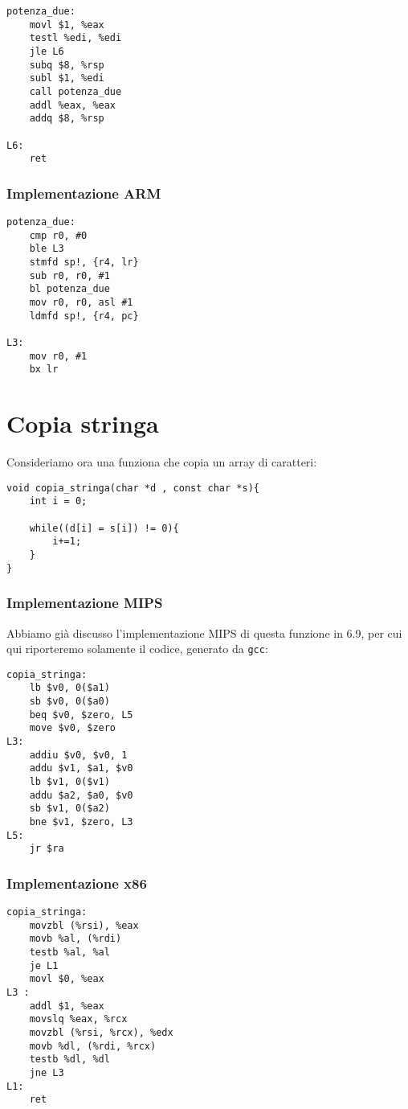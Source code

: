 \documentclass[class=book, crop=false, oneside]{standalone}
\begin{document}
\begin{verbatim}
potenza_due:
	movl $1, %eax
	testl %edi, %edi
	jle L6
	subq $8, %rsp
	subl $1, %edi
	call potenza_due
	addl %eax, %eax
	addq $8, %rsp

L6:
	ret
\end{verbatim}

\subsubsection{Implementazione ARM}

\begin{verbatim}
potenza_due:
	cmp r0, #0
	ble L3
	stmfd sp!, {r4, lr}
	sub r0, r0, #1
	bl potenza_due
	mov r0, r0, asl #1
	ldmfd sp!, {r4, pc}

L3:
	mov r0, #1
	bx lr
\end{verbatim}

\section{Copia stringa}
Consideriamo ora una funziona che copia un array di caratteri:
\begin{verbatim}
void copia_stringa(char *d , const char *s){
	int i = 0;

	while((d[i] = s[i]) != 0){
		i+=1;
	}
}
\end{verbatim}

\subsubsection{Implementazione MIPS}
Abbiamo già discusso l'implementazione MIPS di questa funzione in 6.9, per cui qui riporteremo solamente il codice, generato da \texttt{gcc}:
\begin{verbatim}
copia_stringa:
	lb $v0, 0($a1)
	sb $v0, 0($a0)
	beq $v0, $zero, L5
	move $v0, $zero
L3:
	addiu $v0, $v0, 1
	addu $v1, $a1, $v0
	lb $v1, 0($v1)
	addu $a2, $a0, $v0
	sb $v1, 0($a2)
	bne $v1, $zero, L3
L5:
	jr $ra
\end{verbatim}

\subsubsection{Implementazione x86}

\begin{verbatim}
copia_stringa:
	movzbl (%rsi), %eax
	movb %al, (%rdi)
	testb %al, %al
	je L1
	movl $0, %eax
L3 :
	addl $1, %eax
	movslq %eax, %rcx
	movzbl (%rsi, %rcx), %edx
	movb %dl, (%rdi, %rcx)
	testb %dl, %dl
	jne L3
L1:
	ret
\end{verbatim}
\end{document}
